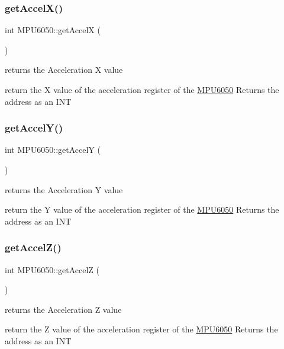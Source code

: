 \subsubsection{\texorpdfstring{get\+Accel\+X()}{getAccelX()}}
{\footnotesize\ttfamily int M\+P\+U6050\+::get\+AccelX (\begin{DoxyParamCaption}{ }\end{DoxyParamCaption})}



returns the Acceleration X value 

return the X value of the acceleration register of the \hyperlink{classMPU6050}{M\+P\+U6050} Returns the address as an I\+NT \mbox{\label{classMPU6050_a7314be9b929224469f3c3d1bd81a6247}} 
\subsubsection{\texorpdfstring{get\+Accel\+Y()}{getAccelY()}}
{\footnotesize\ttfamily int M\+P\+U6050\+::get\+AccelY (\begin{DoxyParamCaption}{ }\end{DoxyParamCaption})}



returns the Acceleration Y value 

return the Y value of the acceleration register of the \hyperlink{classMPU6050}{M\+P\+U6050} Returns the address as an I\+NT \mbox{\label{classMPU6050_a6c60f7d16a251a17c3ffc6a5c98ce1d6}} 
\subsubsection{\texorpdfstring{get\+Accel\+Z()}{getAccelZ()}}
{\footnotesize\ttfamily int M\+P\+U6050\+::get\+AccelZ (\begin{DoxyParamCaption}{ }\end{DoxyParamCaption})}



returns the Acceleration Z value 

return the Z value of the acceleration register of the \hyperlink{classMPU6050}{M\+P\+U6050} Returns the address as an I\+NT \mbox{\label{classMPU6050_a093f4156b743539f1d399a1965fb2ca0}} 
